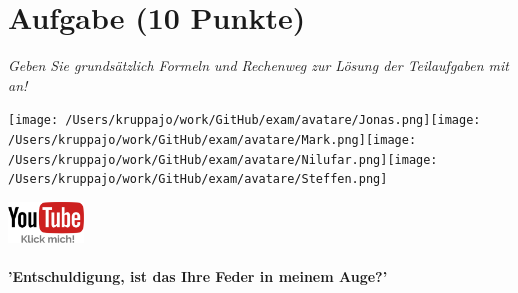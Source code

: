 \documentclass[a4paper, 9pt]{scrartcl}\usepackage[]{graphicx}\usepackage[]{xcolor}
\begin{document}


 
\clearpage

\section{Aufgabe \hfill (10 Punkte)}

\textit{Geben Sie grundsätzlich Formeln und Rechenweg zur Lösung der Teilaufgaben mit an!} \\[1Ex]
 

 
\ifcollection
\begin{flushright}
\tiny\vspace{-3Ex}
\textbf{\examinhaltstart}
\exammodulemathstat
\vspace{-4Ex}
\end{flushright}
\begin{minipage}[t]{0.5\textwidth}
\texttt{[image: /Users/kruppajo/work/GitHub/exam/avatare/Jonas.png]}\hspace{-4mm}\texttt{[image: /Users/kruppajo/work/GitHub/exam/avatare/Mark.png]}\hspace{-4mm}\texttt{[image: /Users/kruppajo/work/GitHub/exam/avatare/Nilufar.png]}\hspace{-4mm}\texttt{[image: /Users/kruppajo/work/GitHub/exam/avatare/Steffen.png]}
\end{minipage}
\begin{minipage}[t]{0.5\textwidth}
\hfill
\href{https://youtu.be/n451XnhtSh4}{\includegraphics[width = 2cm]{img/youtube}}
\end{minipage}
\fi



\ifcollection
\paragraph{'Entschuldigung, ist das Ihre Feder in meinem Auge?'}
\fi
\end{document}
